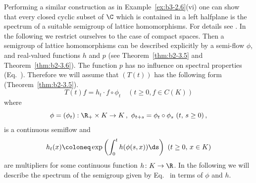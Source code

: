 Performing a similar construction as in Example~\ref{ex:b3-2.6}(vi) one can show that every closed cyclic subset of\/ $\C$  which is contained in a left halfplane is the spectrum of a suitable semigroup of lattice homomorphisms. 
For details see \textcite{derndingernagel:1979}. 
In the following we restrict ourselves to the case of compact spaces. 
Then a semigroup of lattice homomorphisms can be described explicitly by a semi-flow $\phi$, and real-valued functions $h$ and $p$ (see Theorem~\ref{thm:b2-3.5} and Theorem~\ref{thm:b2-3.6}). 
The function $p$ has no influence on spectral properties (\cf Eq.~). 
Therefore we will assume that $(T(t))$ has the following form (\cf Theorem~\ref{thm:b2-3.5}). 
\begin{equation}\label{eq:b3-4.1}
	T(t)f = h_{t}\cdot f\circ\phi_{t} \quad (t \geq 0, f \in C(K)) 
\end{equation}
where 
\[
\phi = (\phi_{t}): \R_{+} \times K \to K\,,\ \phi_{t+s}
=\phi_{t}\circ\phi_{s}  
\ (t,\,s \geq 0)\,,
\]
is a continuous semiflow and 
\[
h_{t}(x) \coloneq \exp\left(\int_{0}^{t} h(\phi(s,x)) \ds\right)\ (t \geq 0,\, x \in K)
\]
are multipliers for some continuous function $h \colon K \to \R$.
In the following we will describe the spectrum of the semigroup given by Eq.~ in terms of\/ $\phi$ and $h$.

